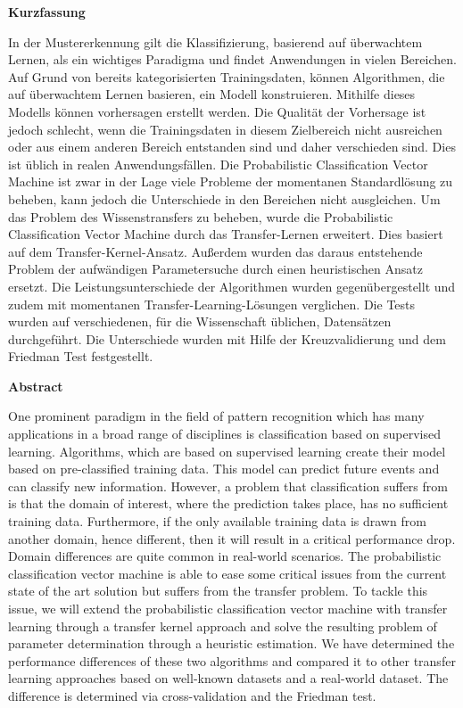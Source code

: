 \begin{center}
 	\Large\textbf{Kurzfassung}\\
\end{center}
In der Mustererkennung gilt die Klassifizierung, basierend auf überwachtem Lernen, als ein wichtiges Paradigma und findet Anwendungen in vielen Bereichen. Auf Grund von bereits kategorisierten Trainingsdaten, können Algorithmen, die auf überwachtem Lernen basieren, ein Modell konstruieren. Mithilfe dieses Modells können vorhersagen erstellt werden. Die Qualität der Vorhersage ist jedoch schlecht, wenn die Trainingsdaten in diesem Zielbereich nicht ausreichen oder aus einem anderen Bereich entstanden sind und daher verschieden sind. Dies ist üblich in realen Anwendungsfällen. Die Probabilistic Classification Vector Machine ist zwar in der Lage viele Probleme der momentanen Standardlösung zu beheben, kann jedoch die Unterschiede in den Bereichen nicht ausgleichen. Um das Problem des Wissenstransfers zu beheben, wurde die Probabilistic Classification Vector Machine durch das Transfer-Lernen erweitert. Dies basiert auf dem Transfer-Kernel-Ansatz. Außerdem wurden das daraus entstehende Problem der aufwändigen Parametersuche durch einen heuristischen Ansatz ersetzt. Die Leistungsunterschiede der Algorithmen wurden gegenübergestellt und zudem mit momentanen Transfer-Learning-Lösungen verglichen. Die Tests wurden auf verschiedenen, für die Wissenschaft üblichen, Datensätzen durchgeführt. Die Unterschiede wurden mit Hilfe der Kreuzvalidierung und dem Friedman Test festgestellt.
\newpage

\begin{center}
	\Large\textbf{Abstract}\\
\end{center}
One prominent paradigm in the field of pattern recognition which has many applications in a broad range of disciplines is classification based on supervised learning. 
Algorithms, which are based on supervised learning create their model based on pre-classified training data.
This model can predict future events and can classify new information.
However, a problem that classification suffers from is that the domain of interest, where the prediction takes place, has no sufficient training data. 
Furthermore, if the only available training data is drawn from another domain, hence different, then it will result in a critical performance drop.
Domain differences are quite common in real-world scenarios.
The probabilistic classification vector machine is able to ease some critical issues from the current state of the art solution but suffers from the transfer problem.
To tackle this issue, we will extend the probabilistic classification vector machine with transfer learning through a transfer kernel approach and solve the resulting problem of parameter determination through a heuristic estimation. 
We have determined the performance differences of these two algorithms and compared it to other transfer learning approaches based on well-known datasets and a real-world dataset. 
The difference is determined via cross-validation and the Friedman test.
